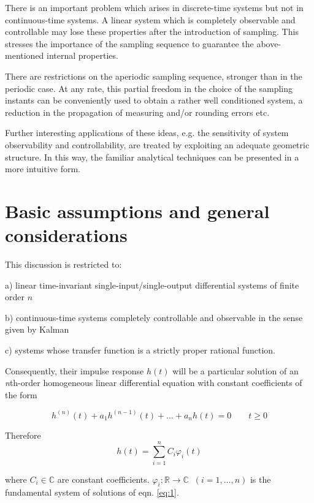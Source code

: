 \documentclass{article}
\begin{document}
There is an important problem which arises in discrete-time
systems but not in continuous-time systems. A linear system which
is completely observable and controllable may lose these
properties after the introduction of sampling. This stresses the
importance of the sampling sequence to guarantee the
above-mentioned internal properties.

There are restrictions on the aperiodic sampling sequence,
stronger than in the periodic case. At any rate, this partial
freedom in the choice of the sampling instants can be conveniently
used to obtain a rather well conditioned system, a reduction in
the propagation of measuring and/or rounding errors etc.

Further interesting applications of these ideas, e.g. the
sensitivity of system observability and controllability, are
treated by exploiting an adequate geometric structure. In this
way, the familiar analytical techniques \cite{Troch} can be
presented in a more intuitive form.

\section{Basic assumptions and general considerations}
This discussion is restricted to:
\begin{description}
\item a) linear time-invariant single-input/single-output
    differential systems of finite order $n$
\item b) continuous-time systems completely controllable and
    observable in the sense given by Kalman \cite{Kalman}
\item c) systems whose transfer function is a strictly proper
    rational function. \end{description}

Consequently, their impulse response $h(t)$ will be a particular
solution of an \textit{n}th-order homogeneous linear differential
equation with constant coefficients of the form

\begin{equation}\label{eq:1}
h^{(n)}(t) + a_1h^{(n-1)}(t)+ \ldots + a_nh(t) = 0 \qquad t \geq 0
\end{equation}

Therefore
\begin{equation}\label{eq:2}
h(t)= \sum\limits_{i=1}^{n} C_i \varphi_i(t)
\end{equation}

where $C_i \in \mathbb{C}$ are constant coefficients. $\varphi_i;
\mathbb{R} \rightarrow \mathbb{C} \;\; (i = 1,\ldots , n)$ is the
fundamental system of solutions of eqn. \ref{eq:1}.
\end{document}
